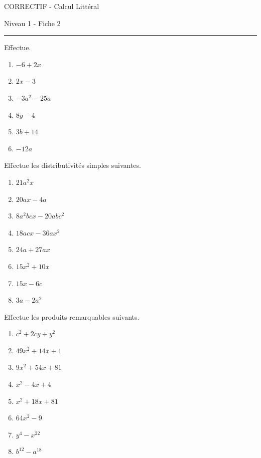 \documentclass[12pt,parskip=half-, twoside=semi]{scrartcl}
\begin{document}
\begin{center}
  \bfseries
  \begin{Huge}
    CORRECTIF - Calcul Littéral
  \end{Huge}
  \smallbreak
  \begin{large}
    Niveau 1  - Fiche 2
  \end{large}
  \smallbreak
  \rule[10pt]{.5\linewidth}{1 pt}
\end{center}

\setcounter{exercise}{0}
\begin{exercise} Effectue.
  \begin{enumerate}[cols=3]
      \item \(-6+2x\)
      \item \(2x-3\)
      \item \(-3a^2-25a\)
      \item \(8y-4\)
      \item \(3b+14\)
      \item \(-12a\)
  \end{enumerate}
\end{exercise}

\begin{exercise} Effectue les distributivités simples suivantes.
  \begin{enumerate}[cols=2]
    \item $21a^2x$
    \item $20ax-4a$
    \item $8a^2bcx-20abc^2$
    \item $18acx-36ax^2$
    \item $24a+27ax$
    \item $15x^2+10x$
    \item $15x-6c$
    \item $3a-2a^2$
  \end{enumerate}
\end{exercise}

\begin{exercise} Effectue les produits remarquables suivants.
  \begin{enumerate}[cols=2]
    \item $c^2+2cy+y^2$
    \item $49x^2+14x+1$
    \item $9x^2+54x+81$
    \item $x^2-4x+4$
    \item $x^2+18x+81$
    \item $64x^2-9$
    \item $y^4-x^{22}$
    \item $b^{12}-a^{18}$
  \end{enumerate}
\end{exercise}
\end{document}
